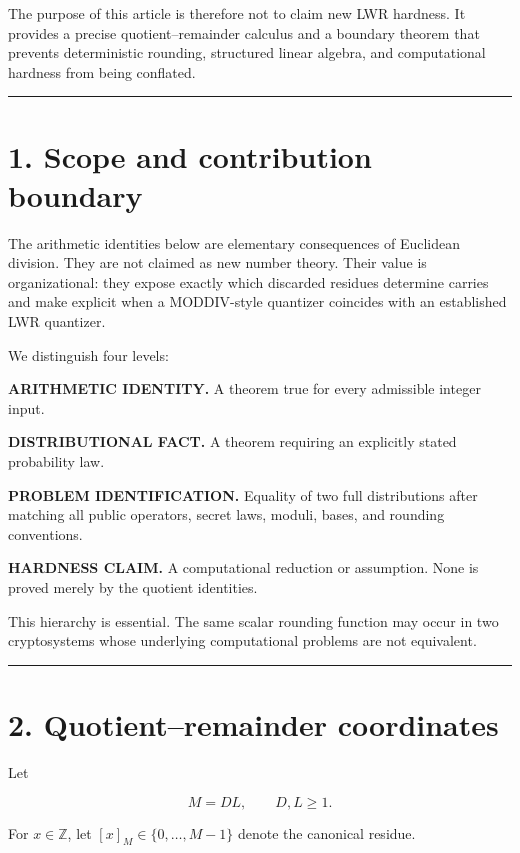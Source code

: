 \documentclass[11pt,a4paper]{article}
\begin{document}
The purpose of this article is therefore not to claim new LWR hardness. It provides a precise quotient--remainder calculus and a boundary theorem that prevents deterministic rounding, structured linear algebra, and computational hardness from being conflated.

\begin{center}\rule{0.5\linewidth}{0.5pt}\end{center}

\section{1. Scope and contribution boundary}\label{scope-and-contribution-boundary}

The arithmetic identities below are elementary consequences of Euclidean division. They are not claimed as new number theory. Their value is organizational: they expose exactly which discarded residues determine carries and make explicit when a MODDIV-style quantizer coincides with an established LWR quantizer.

We distinguish four levels:

\textbf{ARITHMETIC IDENTITY.} A theorem true for every admissible integer input.

\textbf{DISTRIBUTIONAL FACT.} A theorem requiring an explicitly stated probability law.

\textbf{PROBLEM IDENTIFICATION.} Equality of two full distributions after matching all public operators, secret laws, moduli, bases, and rounding conventions.

\textbf{HARDNESS CLAIM.} A computational reduction or assumption. None is proved merely by the quotient identities.

This hierarchy is essential. The same scalar rounding function may occur in two cryptosystems whose underlying computational problems are not equivalent.

\begin{center}\rule{0.5\linewidth}{0.5pt}\end{center}

\section{2. Quotient--remainder coordinates}\label{quotientremainder-coordinates}

Let

\[
M=DL,\qquad D,L\ge1.
\]

For \(x\in\mathbb Z\), let \([x]_M\in\{0,\ldots,M-1\}\) denote the canonical residue.
\end{document}
